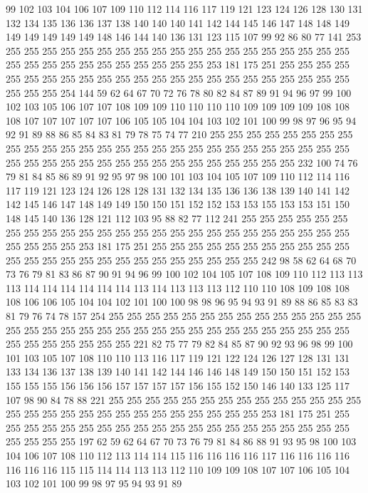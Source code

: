99 102 103 104 106 107 109 110 112 114 116 117 119 121 123 124 126 128 130 131
132 134 135 136 136 137 138 140 140 140 141 142 144 145 146 147 148 148 149 149
149 149 149 149 148 146 144 140 136 131 123 115 107 99 92 86 80 77 141 253
255 255 255 255 255 255 255 255 255 255 255 255 255 255 255 255 255 255 255 255
255 255 255 255 255 255 255 255 255 255 253 181 175 251 255 255 255 255 255 255
255 255 255 255 255 255 255 255 255 255 255 255 255 255 255 255 255 255 255 255
254 144 59 62 64 67 70 72 76 78 80 82 84 87 89 91 94 96 97 99
100 102 103 105 106 107 107 108 109 109 110 110 110 110 109 109 109 109 108 108
108 107 107 107 107 107 106 105 105 104 104 103 102 101 100 99 98 97 96 95
94 92 91 89 88 86 85 84 83 81 79 78 75 74 77 210 255 255 255 255
255 255 255 255 255 255 255 255 255 255 255 255 255 255 255 255 255 255 255 255
255 255 255 255 255 255 255 255 255 255 255 255 255 255 255 255 255 255 255 232
100 74 76 79 81 84 85 86 89 91 92 95 97 98 100 101 103 104 105 107
109 110 112 114 116 117 119 121 123 124 126 128 128 131 132 134 135 136 136 138
139 140 141 142 142 145 146 147 148 149 149 150 150 151 152 152 153 153 155 153
153 151 150 148 145 140 136 128 121 112 103 95 88 82 77 112 241 255 255 255
255 255 255 255 255 255 255 255 255 255 255 255 255 255 255 255 255 255 255 255
255 255 255 255 255 255 253 181 175 251 255 255 255 255 255 255 255 255 255 255
255 255 255 255 255 255 255 255 255 255 255 255 255 255 255 242 98 58 62 64
68 70 73 76 79 81 83 86 87 90 91 94 96 99 100 102 104 105 107 108
109 110 112 113 113 113 114 114 114 114 114 114 113 114 113 113 113 112 110 110
108 109 108 108 108 106 106 105 104 104 102 101 100 100 98 98 96 95 94 93
91 89 88 86 85 83 83 81 79 76 74 78 157 254 255 255 255 255 255 255
255 255 255 255 255 255 255 255 255 255 255 255 255 255 255 255 255 255 255 255
255 255 255 255 255 255 255 255 255 255 255 255 255 255 221 82 75 77 79 82
84 85 87 90 92 93 96 98 99 100 101 103 105 107 108 110 110 113 116 117
119 121 122 124 126 127 128 131 131 133 134 136 137 138 139 140 141 142 144 146
146 148 149 150 150 151 152 153 155 155 155 156 156 156 157 157 157 157 156 155
152 150 146 140 133 125 117 107 98 90 84 78 88 221 255 255 255 255 255 255
255 255 255 255 255 255 255 255 255 255 255 255 255 255 255 255 255 255 255 255
255 255 253 181 175 251 255 255 255 255 255 255 255 255 255 255 255 255 255 255
255 255 255 255 255 255 255 255 255 255 197 62 59 62 64 67 70 73 76 79
81 84 86 88 91 93 95 98 100 103 104 106 107 108 110 112 113 114 114 115
116 116 116 116 117 116 116 116 116 116 116 116 115 115 114 114 113 113 112 110
109 109 108 107 107 106 105 104 103 102 101 100 99 98 97 95 94 93 91 89
